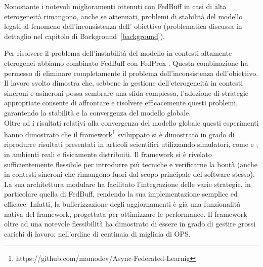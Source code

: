 \documentclass[a4paper, oneside, openright]{report}
\begin{document}
Nonostante i notevoli miglioramenti ottenuti con FedBuff  \cite{DBLP:journals/corr/abs-2106-06639} in casi di alta eterogeneità rimangono, anche se attenuati, problemi di stabilità del modello legati al fenomeno dell'inconsistenza dell' obiettivo \cite{DBLP:journals/corr/abs-2007-07481} (problematica discussa in dettaglio nel capitolo di Background~\ref{background}). 

Per risolvere il problema dell'instabilità del modello in contesti altamente eterogenei abbiamo combinato FedBuff \cite{DBLP:journals/corr/abs-2106-06639} con FedProx \cite{DBLP:journals/corr/abs-1812-06127}. Questa combinazione ha permesso di eliminare completamente il problema dell'inconsistenza dell'obiettivo. \\

Il lavoro svolto dimostra che, sebbene la gestione dell'eterogeneità in contesti sincroni e asincroni possa sembrare una sfida complessa, l'adozione di strategie appropriate consente di affrontare e risolvere efficacemente questi problemi, garantendo la stabilità e la convergenza del modello globale. \\

Oltre ad i risultati relativi alla convergenza del modello globale questi esperimenti hanno dimostrato che il framework\footnote{https://github.com/mamodev/Async-Federated-Learnig} sviluppato si è dimostrato in grado di riprodurre risultati presentati in articoli scientifici utilizzando simulatori, come \cite{DBLP:journals/corr/abs-1812-06127} e \cite{DBLP:journals/corr/abs-2106-06639}, in ambienti reali e fisicamente distribuiti. Il framework si è rivelato sufficientemente flessibile per introdurre più tecniche e verificarne la bontà (anche in contesti sincroni che rimangono fuori dal scopo principale del software stesso). La sua architettura modulare ha facilitato l'integrazione delle varie strategie, in particolare quella di FedBuff, rendendo la sua implementazione semplice ed efficace. Infatti, la bufferizzazione degli aggiornamenti è già una funzionalità nativa del framework, progettata per ottimizzare le performance. Il framework oltre ad una notevole flessibilità ha dimostrato di essere in grado di gestire grossi carichi di lavoro: nell'ordine di centinaia di migliaia di OPS. 
\end{document}
